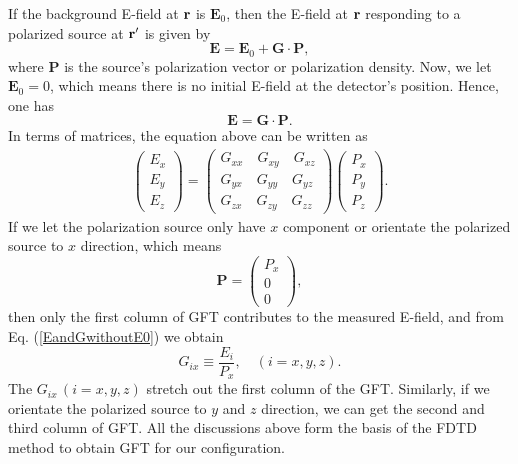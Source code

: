 If the background E-field at $\mathbf{r}$ is $\mathbf{E}_0$, then the E-field at $\mathbf{r}$ responding to a polarized source at $\mathbf{r}'$ is given by
\begin{equation}
 \label{EandGwithE0}
\mathbf{E}=\mathbf{E}_0+\mathbf{G} \cdot \mathbf{P},
\end{equation}
where $\mathbf{P}$ is the source's polarization vector or polarization density.
Now, we let $\mathbf{E}_0=0$, which means there is no initial E-field at the detector's position.
Hence, one has
\begin{equation}\label{eq:EGP}
\mathbf{E}=\mathbf{G} \cdot \mathbf{P}.
\end{equation}
In terms of matrices, the equation above can be written as
\begin{align}
\label{EandGwithoutE0}
\left( \begin{array}{c}
       E_x\\
       E_y\\
       E_z  \end{array} \right)
                   = \left( \begin{array}{c}
                      G_{xx} \quad G_{xy} \quad G_{xz} \\
                      G_{yx} \quad G_{yy} \quad G_{yz} \\
                      G_{zx} \quad G_{zy} \quad G_{zz}  \end{array}  \right) \left( \begin{array}{c}
                                                                                     P_x\\
                                                                                     P_y\\
                                                                                     P_z
                                                                                    \end{array} \right).
\end{align}
If we let the polarization source only have $x$ component or orientate the polarized source to $x$ direction, which means
\begin{equation}
 \label{Px}
\mathbf{P}=\left( \begin{array}{c}
                   P_x\\
                   0\\
                   0
                  \end{array} \right),
\end{equation}
then only the first column of GFT contributes to the measured E-field, and from Eq. (\ref{EandGwithoutE0}) we obtain
\begin{equation}
 \label{Gix}
G_{ix} \equiv \frac{E_{i}}{P_x}, \quad (i=x, y, z).
\end{equation}
The $G_{ix}\,(i=x, y, z)$ stretch out the first column of the GFT.
Similarly, if we orientate the polarized source to $y$ and $z$ direction, we can get the second and third column of GFT.
All the discussions above form the basis of the FDTD method to obtain GFT for our configuration.


